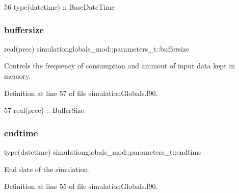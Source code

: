 \begin{DoxyCode}
56         \textcolor{keywordtype}{type}(datetime)  :: BaseDateTime
\end{DoxyCode}
\mbox{\label{structsimulationglobals__mod_1_1parameters__t_a897b2f6d34ecad28a7ceb45c1dcb8dfd}} 
\subsubsection{\texorpdfstring{buffersize}{buffersize}}
{\footnotesize\ttfamily real(prec) simulationglobals\+\_\+mod\+::parameters\+\_\+t\+::buffersize\hspace{0.3cm}{\ttfamily [private]}}



Controls the frequency of consumption and ammout of input data kept in memory. 



Definition at line 57 of file simulation\+Globals.\+f90.


\begin{DoxyCode}
57         \textcolor{keywordtype}{real(prec)}      :: BufferSize
\end{DoxyCode}
\mbox{\label{structsimulationglobals__mod_1_1parameters__t_a2fcf43eac4c8f57debf9f35d90a121f6}} 
\subsubsection{\texorpdfstring{endtime}{endtime}}
{\footnotesize\ttfamily type(datetime) simulationglobals\+\_\+mod\+::parameters\+\_\+t\+::endtime\hspace{0.3cm}{\ttfamily [private]}}



End date of the simulation. 



Definition at line 55 of file simulation\+Globals.\+f90.


